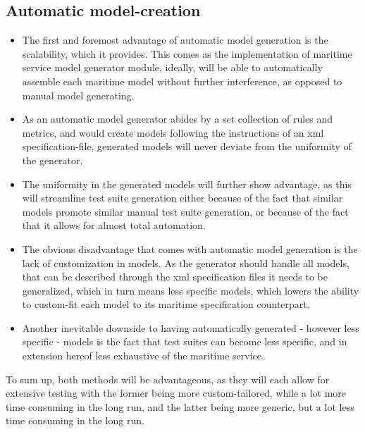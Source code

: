 \subsection{Automatic model-creation}
\begin{itemize}
	\item The first and foremost advantage of automatic model generation is the scalability, which it provides. This comes as the implementation of  maritime service model generator module, ideally, will be able to automatically assemble each maritime model without further interference, as opposed to manual model generating.
	\item As an automatic model generator abides by a set collection of rules and metrics, and would create models following the instructions of an xml specification-file, generated models will never deviate from the uniformity of the generator.
	\item The uniformity in the generated models will further show advantage, as this will streamline test suite generation either because of the fact that similar models promote similar manual test suite generation, or because of the fact that it allows for almost total automation.
\end{itemize}
\begin{itemize}
	\item The obvious disadvantage that comes with automatic model generation is the lack of customization in models. As the generator should handle all models, that can be described through the xml specification files it needs to be generalized, which in turn means less specific models, which lowers the ability to custom-fit each model to its maritime specification counterpart.
	\item Another inevitable downside to having automatically generated - however less specific - models is the fact that test suites can become less specific, and in extension hereof less exhaustive of the maritime service.
\end{itemize}

To sum up, both methods will be advantageous, as they will each allow for extensive testing with the former being more custom-tailored, while a lot more time consuming in the long run, and the latter being more generic, but a lot less time consuming in the long run.